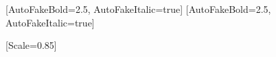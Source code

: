 \usepackage{xeCJK}
\usepackage{fontspec}
\usepackage{geometry}
\usepackage{indentfirst}
\usepackage{titlesec}
\usepackage{caption}
\usepackage{float}
\usepackage{setspace}
\usepackage{booktabs}
\usepackage{multirow}
\usepackage{graphicx}
\usepackage{fancyhdr}
\usepackage{amsmath,amssymb}

\geometry{a4paper, top=2.54cm, bottom=2.54cm, left=2.8cm, right=2.8cm}

[AutoFakeBold=2.5, AutoFakeItalic=true]
[AutoFakeBold=2.5, AutoFakeItalic=true]

\setmainfont{Times New Roman}
\setsansfont{Arial}
\setmonofont{Menlo}[Scale=0.85]

\renewcommand{\figurename}{图}
\renewcommand{\tablename}{表}

\setlength{\parindent}{2em}
\setlength{\parskip}{4pt plus 1.5pt minus 1pt}

\pagestyle{fancy}
\fancyhf{}
\fancyfoot[C]{\thepage}
\renewcommand{\headrulewidth}{0pt}
\renewcommand{\footrulewidth}{0pt}

\fancypagestyle{plain}{
  \fancyhf{}
  \fancyfoot[C]{\thepage}
  \renewcommand{\headrulewidth}{0pt}
}

\titleformat{\section}[block]{\centering\fontsize{20pt}{24pt}\selectfont\bfseries\sffamily}{\thesection}{1em}{}
\titlespacing*{\section}{0pt}{24pt}{18pt}

\titleformat{\subsection}[block]{\centering\fontsize{15pt}{18pt}\selectfont\bfseries\sffamily}{\thesubsection}{1em}{}
\titlespacing*{\subsection}{0pt}{18pt}{12pt}

